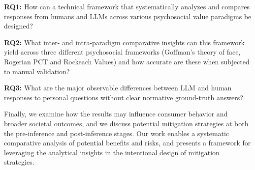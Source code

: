 \medskip\textbf{RQ1:} How can a technical framework that systematically analyzes and compares responses from humans and LLMs across various psychosocial value paradigms be designed?  

\medskip\textbf{RQ2:} What inter- and intra-paradigm comparative insights can this framework yield across three different psychosocial frameworks (Goffman’s theory of face, Rogerian PCT and Rockeach Values) and how accurate are these when subjected to manual validation?

\medskip\textbf{RQ3:} What are the major observable differences between LLM and human responses to personal questions without clear normative ground-truth answers? 

Finally, we examine how the results may influence consumer behavior and broader societal outcomes, and we discuss potential mitigation strategies at both the pre-inference and post-inference stages. Our work enables a systematic comparative analysis of potential benefits and risks, and presents a framework for leveraging the analytical insights in the intentional design of mitigation strategies.






